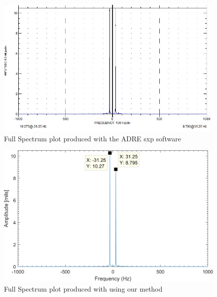 		\begin{figure}[H]
			\centering
			\includegraphics[width=.6\linewidth]{./figures/Images/Figure_7}
			\caption{Full Spectrum plot produced with the ADRE sxp software}
			\label{fig:Figure_7}
		\end{figure}
		\begin{figure}[H]	
			\centering
			\includegraphics[width=.6\linewidth]{./figures/Images/Figure_8}
			\caption{Full Spectrum plot produced with using our method}
			\label{fig:Figure_8}
		\end{figure}
